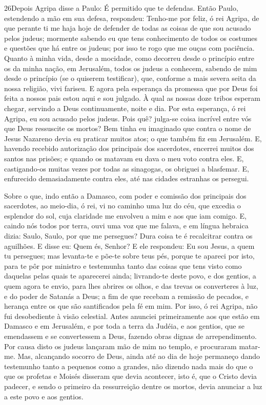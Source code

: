 \lettrine{26} Depois Agripa disse a Paulo: É permitido que te
defendas. Então Paulo, estendendo a mão em sua defesa, respondeu:
Tenho-me por feliz, ó rei Agripa, de que perante ti me haja hoje
de defender de todas as coisas de que sou acusado pelos judeus;
mormente sabendo eu que tens conhecimento de todos os costumes e
questões que há entre os judeus; por isso te rogo que me ouças com
paciência. Quanto à minha vida, desde a mocidade, como decorreu
desde o princípio entre os da minha nação, em Jerusalém, todos os
judeus a conhecem, sabendo de mim desde o princípio (se o
quiserem testificar), que, conforme a mais severa seita da nossa
religião, vivi fariseu. E agora pela esperança da promessa que
por Deus foi feita a nossos pais estou aqui e sou julgado. À
qual as nossas doze tribos esperam chegar, servindo a Deus
continuamente, noite e dia. Por esta esperança, ó rei Agripa, eu sou
acusado pelos judeus. Pois quê? julga-se coisa incrível entre
vós que Deus ressuscite os mortos? Bem tinha eu imaginado que
contra o nome de Jesus Nazareno devia eu praticar muitos atos;
o que também fiz em Jerusalém. E, havendo recebido
autorização dos principais dos sacerdotes, encerrei muitos dos
santos nas prisões; e quando os matavam eu dava o meu voto contra
eles. E, castigando-os muitas vezes por todas as sinagogas,
os obriguei a blasfemar. E, enfurecido demasiadamente contra eles,
até nas cidades estranhas os persegui.

Sobre o que, indo então a Damasco, com poder e comissão dos
principais dos sacerdotes, ao meio-dia, ó rei, vi no caminho
uma luz do céu, que excedia o esplendor do sol, cuja claridade me
envolveu a mim e aos que iam comigo. E, caindo nós todos por
terra, ouvi uma voz que me falava, e em língua hebraica dizia:
Saulo, Saulo, por que me persegues? Dura coisa te é recalcitrar
contra os aguilhões. E disse eu: Quem és, Senhor? E ele
respondeu: Eu sou Jesus, a quem tu persegues; mas levanta-te
e põe-te sobre teus pés, porque te apareci por isto, para te pôr por
ministro e testemunha tanto das coisas que tens visto como daquelas
pelas quais te aparecerei ainda; livrando-te deste povo, e
dos gentios, a quem agora te envio, para lhes abrires os
olhos, e das trevas os converteres à luz, e do poder de Satanás a
Deus; a fim de que recebam a remissão de pecados, e herança entre os
que são santificados pela fé em mim. Por isso, ó rei Agripa,
não fui desobediente à visão celestial. Antes anunciei
primeiramente aos que estão em Damasco e em Jerusalém, e por toda a
terra da Judéia, e aos gentios, que se emendassem e se convertessem
a Deus, fazendo obras dignas de arrependimento. Por causa
disto os judeus lançaram mão de mim no templo, e procuraram
matar-me. Mas, alcançando socorro de Deus, ainda até ao dia
de hoje permaneço dando testemunho tanto a pequenos como a grandes,
não dizendo nada mais do que o que os profetas e Moisés disseram que
devia acontecer, isto é, que o Cristo devia padecer, e sendo
o primeiro da ressurreição dentre os mortos, devia anunciar a luz a
este povo e aos gentios.

